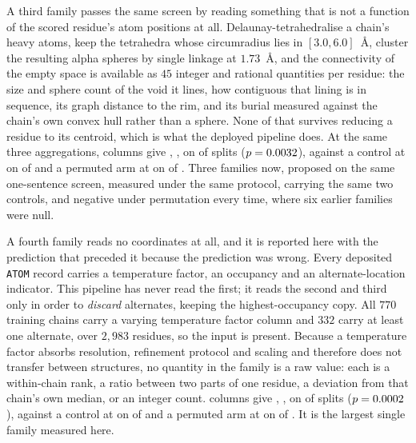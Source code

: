 \documentclass[11pt]{article}
\begin{document}
A third family passes the same screen by reading something that is not a
function of the scored residue's atom positions at all. Delaunay-tetrahedralise
a chain's heavy atoms, keep the tetrahedra whose circumradius lies in
\([3.0, 6.0]\)~\AA{}, cluster the resulting alpha spheres by single linkage at
\(1.73\)~\AA{}, and the connectivity of the empty space is available as
\(45\) integer and rational quantities per residue: the size and sphere count of
the void it lines, how contiguous that lining is in sequence, its graph distance
to the rim, and its burial measured against the chain's own convex hull rather
than a sphere. None of that survives reducing a residue to its centroid, which
is what the deployed pipeline does. At the same three aggregations,
\FamVoidCols{} columns give \FamVoid{}, \FamVoidCI{}, on \FamVoidSplits{} of
\FamVoidOf{} splits (\(p=0.0032{}\)), against a control at
\FamVoidControl{} on \FamVoidControlSplits{} of \FamVoidOf{} and a permuted arm
at \FamVoidPerm{} on \FamVoidPermSplits{} of \FamVoidPermOf{}. Three families
now, proposed on the same one-sentence screen, measured under the same protocol,
carrying the same two controls, and negative under permutation every time, where
six earlier families were null.

A fourth family reads no coordinates at all, and it is reported here with the
prediction that preceded it because the prediction was wrong. Every deposited
\texttt{ATOM} record carries a temperature factor, an occupancy and an
alternate-location indicator. This pipeline has never read the first; it reads
the second and third only in order to \emph{discard} alternates, keeping the
highest-occupancy copy. All \(770\) training chains carry a varying temperature
factor column and \(332\) carry at least one alternate, over \(2{,}983\)
residues, so the input is present. Because a temperature factor absorbs
resolution, refinement protocol and scaling and therefore does not transfer
between structures, no quantity in the family is a raw value: each is a
within-chain rank, a ratio between two parts of one residue, a deviation from
that chain's own median, or an integer count. \FamDispCols{} columns give
\FamDisp{}, \FamDispCI{}, on \FamDispSplits{} of \FamDispOf{} splits
(\(p=0.0002{}\)), against a control at \FamDispControl{} on
\FamDispControlSplits{} of \FamDispOf{} and a permuted arm at \FamDispPerm{} on
\FamDispPermSplits{} of \FamDispPermOf{}. It is the largest single family
measured here.
\end{document}
